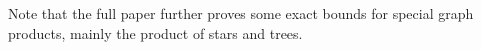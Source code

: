 \documentclass[../main.tex]{subfiles}
\begin{document}
	Note that the full paper \cite{DMWW24} further proves some exact bounds for special graph products, mainly the product of stars and trees. 
	
	
	
	
	
\end{document}
